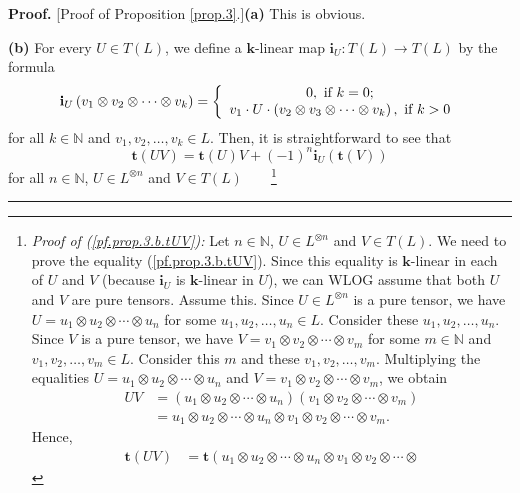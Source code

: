 \documentclass[numbers=enddot,12pt,final,onecolumn,notitlepage]{scrartcl}%
\theoremstyle{definition}
\newenvironment{proof}[1][Proof]{\noindent\textbf{#1.} }{\ \rule{0.5em}{0.5em}}
\begin{document}
\begin{proof}
[Proof of Proposition \ref{prop.3}.]\textbf{(a)} This is obvious. \medskip

\textbf{(b)} For every $U\in T\left(  L\right)  $, we define a $\mathbf{k}%
$-linear map $\mathbf{i}_{U}:T\left(  L\right)  \rightarrow T\left(  L\right)
$ by the formula%
\[
\mathbf{i}_{U}\left(  v_{1}\otimes v_{2}\otimes\cdots\otimes v_{k}\right)
=\left\{
\begin{array}
[c]{c}%
0,\text{ if }k=0;\\
v_{1}\cdot U\cdot\left(  v_{2}\otimes v_{3}\otimes\cdots\otimes v_{k}\right)
,\text{ if }k>0
\end{array}
\right.
\]
for all $k\in\mathbb{N}$ and $v_{1},v_{2},\ldots,v_{k}\in L$. Then, it is
straightforward to see that%
\begin{equation}
\mathbf{t}\left(  UV\right)  =\mathbf{t}\left(  U\right)  V+\left(  -1\right)
^{n}\mathbf{i}_{U}\left(  \mathbf{t}\left(  V\right)  \right)
\label{pf.prop.3.b.tUV}%
\end{equation}
for all $n\in\mathbb{N}$, $U\in L^{\otimes n}$ and $V\in T\left(  L\right)
$\ \ \ \ \footnote{\textit{Proof of (\ref{pf.prop.3.b.tUV}):} Let
$n\in\mathbb{N}$, $U\in L^{\otimes n}$ and $V\in T\left(  L\right)  $. We need
to prove the equality (\ref{pf.prop.3.b.tUV}). Since this equality is
$\mathbf{k}$-linear in each of $U$ and $V$ (because $\mathbf{i}_{U}$ is
$\mathbf{k}$-linear in $U$), we can WLOG assume that both $U$ and $V$ are pure
tensors. Assume this. Since $U\in L^{\otimes n}$ is a pure tensor, we have
$U=u_{1}\otimes u_{2}\otimes\cdots\otimes u_{n}$ for some $u_{1},u_{2}%
,\ldots,u_{n}\in L$. Consider these $u_{1},u_{2},\ldots,u_{n}$. Since $V$ is a
pure tensor, we have $V=v_{1}\otimes v_{2}\otimes\cdots\otimes v_{m}$ for some
$m\in\mathbb{N}$ and $v_{1},v_{2},\ldots,v_{m}\in L$. Consider this $m$ and
these $v_{1},v_{2},\ldots,v_{m}$. Multiplying the equalities $U=u_{1}\otimes
u_{2}\otimes\cdots\otimes u_{n}$ and $V=v_{1}\otimes v_{2}\otimes\cdots\otimes
v_{m}$, we obtain%
\begin{align*}
UV  &  =\left(  u_{1}\otimes u_{2}\otimes\cdots\otimes u_{n}\right)  \left(
v_{1}\otimes v_{2}\otimes\cdots\otimes v_{m}\right) \\
&  =u_{1}\otimes u_{2}\otimes\cdots\otimes u_{n}\otimes v_{1}\otimes
v_{2}\otimes\cdots\otimes v_{m}.
\end{align*}
Hence,
\begin{align}
\mathbf{t}\left(  UV\right)   &  =\mathbf{t}\left(  u_{1}\otimes u_{2}%
\otimes\cdots\otimes u_{n}\otimes v_{1}\otimes v_{2}\otimes\cdots\otimes

\end{align}}
\end{proof}
\end{document}
